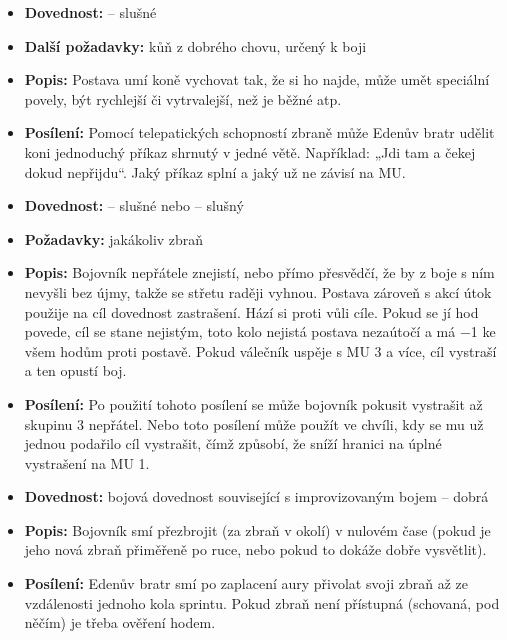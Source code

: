 \documentclass[../main.tex]{subfiles}
\begin{document}
\begin{specialita}[Válečný oř, II]
\begin{itemize}
	\item \textbf{Dovednost:}  – slušné
	\item \textbf{Další požadavky:} kůň z dobrého chovu, určený k boji
	\item \textbf{Popis:} Postava umí koně vychovat tak, že si ho najde, může umět speciální povely, být rychlejší či vytrvalejší, než je běžné atp.
	\item \textbf{Posílení:} Pomocí telepatických schopností zbraně může Edenův bratr udělit koni jednoduchý příkaz shrnutý v jedné větě. Například: „Jdi tam a čekej dokud nepřijdu“. Jaký příkaz splní a jaký už ne závisí na MU.
\end{itemize}
\end{specialita}

\begin{specialita}[Zastrašení, II]
\begin{itemize}
	\item \textbf{Dovednost:}  – slušné nebo  – slušný
	\item \textbf{Požadavky:} jakákoliv zbraň
	\item \textbf{Popis:} Bojovník nepřátele znejistí, nebo přímo přesvědčí, že by z boje s ním nevyšli bez újmy, takže se střetu raději vyhnou. Postava zároveň s akcí útok použije na cíl dovednost zastrašení. Hází si proti vůli cíle. Pokud se jí hod povede, cíl se stane nejistým, toto kolo nejistá postava nezaútočí a má −1 ke všem hodům proti postavě. Pokud válečník uspěje s MU 3 a více, cíl vystraší a ten opustí boj.
	\item \textbf{Posílení:} Po použití tohoto posílení se může bojovník pokusit vystrašit až skupinu 3 nepřátel. Nebo toto posílení může použít ve chvíli, kdy se mu už jednou podařilo cíl vystrašit, čímž způsobí, že sníží hranici na úplné vystrašení na MU 1.
\end{itemize}
\end{specialita}

\begin{specialita}
\begin{itemize}
	\item \textbf{Dovednost:} bojová dovednost související s improvizovaným bojem – dobrá
	\item \textbf{Popis:} Bojovník smí přezbrojit (za zbraň v okolí) v nulovém čase (pokud je jeho nová zbraň přiměřeně po ruce, nebo pokud to dokáže dobře vysvětlit).
	\item \textbf{Posílení:} Edenův bratr smí po zaplacení aury přivolat svoji zbraň až ze vzdálenosti jednoho kola sprintu. Pokud zbraň není přístupná (schovaná, pod něčím) je třeba ověření hodem.
\end{itemize}
\end{specialita}
\end{document}

